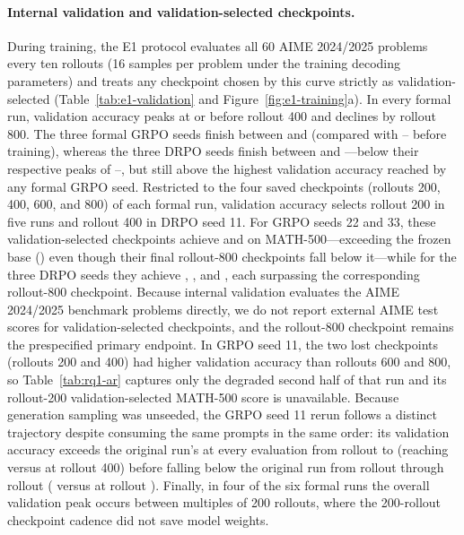 \documentclass[10pt]{article}
\begin{document}
\paragraph{Internal validation and validation-selected checkpoints.}
During training, the E1 protocol evaluates all 60 AIME 2024/2025 problems every ten rollouts (16 samples per problem under the training decoding parameters) and treats any checkpoint chosen by this curve strictly as validation-selected (Table~\ref{tab:e1-validation} and Figure~\ref{fig:e1-training}a).
In every formal run, validation accuracy peaks at or before rollout 400 and declines by rollout 800.
The three formal GRPO seeds finish between \EOneValidGRPOEndMin{} and \EOneValidGRPOEndMax{} (compared with \EOneValidGRPOStartMin{}--\EOneValidGRPOStartMax{} before training), whereas the three DRPO seeds finish between \EOneValidDRPOEndMin{} and \EOneValidDRPOEndMax{}---below their respective peaks of \EOneValidDRPOPeakMin{}--\EOneValidDRPOPeakMax{}, but still above the highest validation accuracy reached by any formal GRPO seed.
Restricted to the four saved checkpoints (rollouts 200, 400, 600, and 800) of each formal run, validation accuracy selects rollout 200 in five runs and rollout 400 in DRPO seed 11.
For GRPO seeds 22 and 33, these validation-selected checkpoints achieve \EOneMathGRPOEarlyTwentyTwo{} and \EOneMathGRPOEarlyThirtyThree{} on MATH-500---exceeding the frozen base (\EOneMathBase{}) even though their final rollout-800 checkpoints fall below it---while for the three DRPO seeds they achieve \EOneMathDRPOSelectedEleven{}, \EOneMathDRPOSelectedTwentyTwo{}, and \EOneMathDRPOSelectedThirtyThree{}, each surpassing the corresponding rollout-800 checkpoint.
Because internal validation evaluates the AIME 2024/2025 benchmark problems directly, we do not report external AIME test scores for validation-selected checkpoints, and the rollout-800 checkpoint remains the prespecified primary endpoint.
In GRPO seed 11, the two lost checkpoints (rollouts 200 and 400) had higher validation accuracy than rollouts 600 and 800, so Table~\ref{tab:rq1-ar} captures only the degraded second half of that run and its rollout-200 validation-selected MATH-500 score is unavailable.
Because generation sampling was unseeded, the GRPO seed 11 rerun follows a distinct trajectory despite consuming the same prompts in the same order: its validation accuracy exceeds the original run's at every evaluation from rollout \EOneRerunAboveFrom{} to \EOneRerunAboveTo{} (reaching \EOneValidRerunFour{} versus \EOneValidGRPOElevenFour{} at rollout 400) before falling below the original run from rollout \EOneRerunBelowFrom{} through rollout \EOneRerunLastEval{} (\EOneValidRerunLast{} versus \EOneValidGRPOElevenLast{} at rollout \EOneRerunLastEval{}).
Finally, in four of the six formal runs the overall validation peak occurs between multiples of 200 rollouts, where the 200-rollout checkpoint cadence did not save model weights.
\end{document}
